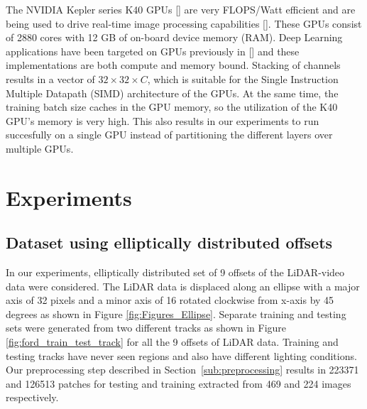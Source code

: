 \documentclass{article}
\begin{document}
The NVIDIA Kepler series K40 GPUs [\cite{NVIDIA-Inc.2012NVIDIAs-Ne}] are very FLOPS/Watt efficient and are being used to drive real-time image processing capabilities [\cite{Venugopal2013Accelerati}]. These GPUs consist of 2880 cores with 12 GB of on-board device memory (RAM). Deep Learning applications have been targeted on GPUs previously in [\cite{Krizhevsky2012Imagenet-C}] and these implementations are both compute and memory bound. Stacking of channels results in a vector of $32 \times 32 \times \mathit{C}$, which is suitable for the Single Instruction Multiple Datapath (SIMD) architecture of the GPUs. At the same time, the training batch size caches in the GPU memory, so the utilization of the K40 GPU's memory is very high. This also results in our experiments to run succesfully on a single GPU instead of partitioning the different layers over multiple GPUs.
 


\section{Experiments} %
\label{sec:experiments}

\subsection{Dataset using elliptically distributed offsets} %
\label{sub:dataset_using_elliptically_distributed_offsets}


In our experiments, elliptically distributed set of 9 offsets of the LiDAR-video data were considered. The LiDAR data is displaced along an ellipse with a major axis of 32 pixels and a minor axis of 16 rotated clockwise from x-axis by 45 degrees as shown in Figure \ref{fig:Figures_Ellipse}. Separate training and testing sets were generated from two different tracks as shown in Figure \ref{fig:ford_train_test_track} for all the 9 offsets of LiDAR data. Training and testing tracks have never seen regions and also have different lighting conditions. Our preprocessing step described in Section~\ref{sub:preprocessing} results in 223371 and 126513 patches for testing and training extracted from 469 and 224 images respectively.
\end{document}
